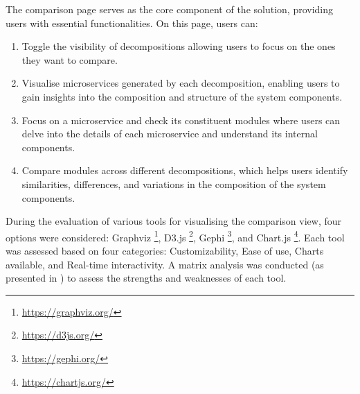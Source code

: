 The comparison page serves as the core component of the solution, providing
users with essential functionalities. On this page, users can:

\begin{enumerate}
  \item Toggle the visibility of decompositions allowing users to focus on the
    ones they want to compare.
  \item Visualise microservices generated by each decomposition, enabling users
    to gain insights into the composition and structure of the system
    components.
  \item Focus on a microservice and check its constituent modules where users
    can delve into the details of each microservice and understand its internal
    components.
  \item Compare modules across different decompositions, which helps users
    identify similarities, differences, and variations in the composition of
    the system components.
\end{enumerate}

During the evaluation of various tools for visualising the comparison view,
four options were considered: Graphviz \footnote{\url{https://graphviz.org/}},
D3.js \footnote{\url{https://d3js.org/}}, Gephi
\footnote{\url{https://gephi.org/}}, and Chart.js
\footnote{\url{https://chartjs.org/}}. Each tool was assessed based on four
categories: Customizability, Ease of use, Charts available, and Real-time
interactivity. A matrix analysis was conducted (as presented in
) to assess the strengths and
weaknesses of each tool.

